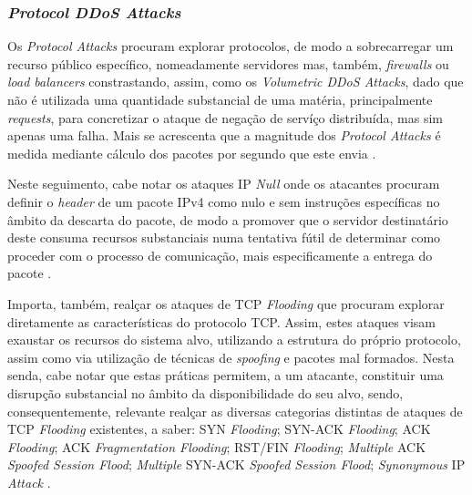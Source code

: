 \subsubsection{\textit{Protocol DDoS Attacks}}
Os \textit{Protocol Attacks} procuram explorar protocolos, de modo a sobrecarregar um recurso público específico, nomeadamente servidores mas, também, \textit{firewalls} ou \textit{load balancers} constrastando, assim, como os \textit{Volumetric DDoS Attacks}, dado que não é utilizada uma quantidade substancial de uma matéria, principalmente \textit{requests}, para concretizar o ataque de negação de servíço distribuída, mas sim apenas uma falha. Mais se acrescenta que a magnitude dos \textit{Protocol Attacks} é medida mediante cálculo dos pacotes por segundo que este envia \cite{esecurityplanet_types_of_ddos_attacks}.


Neste seguimento, cabe notar os ataques IP \textit{Null} onde os atacantes procuram definir o \textit{header} de um pacote IPv4 como nulo e sem instruções específicas no âmbito da descarta do pacote, de modo a promover que o servidor destinatário deste consuma recursos substanciais numa tentativa fútil de determinar como proceder com o processo de comunicação, mais especificamente a entrega do pacote \cite{esecurityplanet_types_of_ddos_attacks}.

Importa, também, realçar os ataques de TCP \textit{Flooding} que procuram explorar diretamente as características do protocolo TCP. Assim, estes ataques visam exaustar os recursos do sistema alvo, utilizando a estrutura do próprio protocolo, assim como via utilização de técnicas de \textit{spoofing} e pacotes mal formados. Nesta senda, cabe notar que estas práticas permitem, a um atacante, constituir uma disrupção substancial no âmbito da disponibilidade do seu alvo, sendo, consequentemente, relevante realçar as diversas categorias distintas de ataques de TCP \textit{Flooding} existentes, a saber: SYN \textit{Flooding}; SYN-ACK \textit{Flooding}; ACK \textit{Flooding}; ACK \textit{Fragmentation Flooding}; RST/FIN \textit{Flooding}; \textit{Multiple} ACK \textit{Spoofed Session Flood}; \textit{Multiple} SYN-ACK \textit{Spoofed Session Flood}; \textit{Synonymous} IP \textit{Attack} \cite{esecurityplanet_types_of_ddos_attacks,connectwise_types_of_ddos_attacks}.


